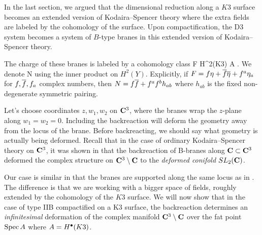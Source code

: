 \documentclass[../main.tex]{subfiles}
\begin{document}
In the last section, we argued that the dimensional reduction along a $K3$ surface becomes an extended version of Kodaira--Spencer theory where the extra fields are labeled by the cohomology of the surface.
Upon compactification, the D3 system becomes a system of $B$-type branes in this extended version of Kodaira--Spencer theory. 

The charge of these branes is labeled by a cohomology class 
\beqn
F \in H^2(K3) \subset A .
\eeqn
We denote 
\beqn
N  {}
\eeqn
using the inner product on $H^2(Y)$. 
Explicitly, if $F = f \eta + \overline f \overline \eta + f^a \eta_a$ for $f, \overline f, f_a$ complex numbers, then $N = f \overline f + f^{a} f^{b} h_{ab}$ where $h_{ab}$ is the fixed non-degenerate symmetric pairing. 

Let's choose coordinates $z,w_1,w_2$ on $\mathbf{C}^3$, where the branes wrap the $z$-plane along $w_1=w_2=0$. 
Including the backreaction will deform the geometry away from the locus of the brane. 
Before backreacting, we should say what geometry is actually being deformed. 
Recall that in the case of ordinary Kodaira--Spencer theory on $\mathbf{C}^3$, it was shown in \cite{CGhol} that the backreaction of B-branes along $\mathbf{C} \subset\mathbf{C}^3$ deformed the complex structure on $\mathbf{C}^3 \setminus \mathbf{C}$ to the {\em deformed conifold} $SL_2(\mathbf{C})$. 

Our case is similar in that the branes are supported along the same locus as in \cite{CGhol}.
The difference is that we are working with a bigger space of fields, roughly extended by the cohomology of the $K3$ surface. 
We will now show that in the case of type IIB compactified on a K3 surface, the backreaction determines an {\em infinitesimal} deformation of the complex manifold $\mathbf{C}^3 \setminus \mathbf{C}$ over the fat point $\operatorname{Spec} A$ where $A = H^{\bullet}(K3)$. 
 
\end{document}
